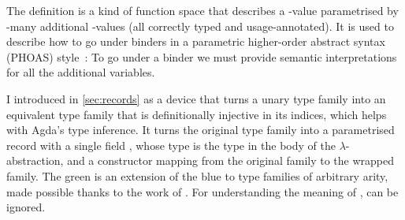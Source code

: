 
The definition
\AgdaSpace{}\AgdaBound{$\V$}\AgdaSpace{}\AgdaBound{$\C$}%
\AgdaSpace{}\AgdaBound{$\Delta$} is a kind
of function space that describes a \AgdaBound{$\C$}-value parametrised by
\AgdaBound{$\Delta$}-many additional \AgdaBound{$\V$}-values (all correctly
typed and usage-annotated).
It is used to describe how to go under binders in a
parametric higher-order abstract syntax (PHOAS) style~\citep{Chlipala08}:
To go under a binder we must
provide semantic interpretations for all the additional variables.






I introduced  in \cref{sec:records} as a device that turns a
unary type family into an equivalent type family that is definitionally
injective in its indices, which helps with Agda's type inference.
It turns the original type family into a parametrised
record with a single field , whose type is the type in
the body of the $\lambda$-abstraction, and a constructor
 mapping from the original family to the wrapped
family.
The green  is an extension of the blue  to
type families of arbitrary arity, made possible thanks to the work of
\citet{Allais19}.
For understanding the meaning of
,  can be ignored.


